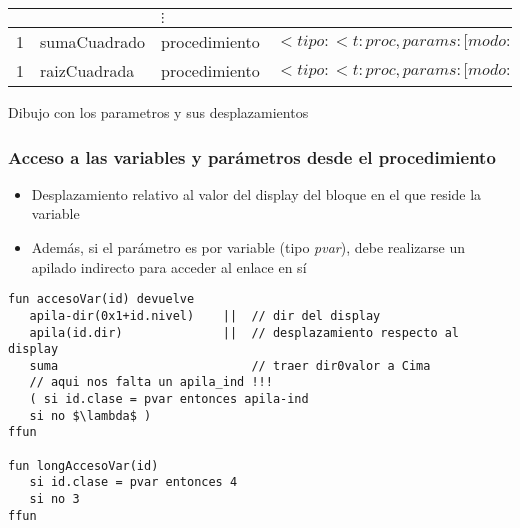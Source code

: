 \documentclass[hyperref={pdfpagelabels=false},tree-dvips,compress]{beamer}
\begin{document}
\begin{frame}[fragile]
\begin{tabular*}{0.80\textwidth}{|l|l|l|l|}
               &                   & $\vdots$          &                                                                                                                                                                                                                                                                       \\ \hline
1              & sumaCuadrado      & procedimiento     & $<tipo:<t:proc, params: {[}modo:valor{]}, tipo:<tipo:<t:num>{]}{[}modo:valor, tipo:<t:num>{]}{[}modo:variable, tipo:<t:num>{]}>>>$                    \\ \hline
1              & raizCuadrada      & procedimiento     & $<tipo:<t:proc, params: {[}modo:valor{]}, tipo:<t:num>{]}>>$                                                                                                                                                   \\ \hline
\end{tabular*}


Dibujo con los parametros y sus desplazamientos

\end{frame}
\begin{frame}[fragile]
\frametitle{Acceso a las variables y parámetros desde el procedimiento}

\begin{itemize}
	\item Desplazamiento relativo al valor del display del bloque en el que reside la variable
	\item Además, si el parámetro es por variable (tipo \emph{pvar}), debe realizarse un apilado indirecto para acceder al enlace en sí
\end{itemize}

\begin{lstlisting}[style=codigoMP,basicstyle=\scriptsize\ttfamily,mathescape]
fun accesoVar(id) devuelve
   apila-dir(0x1+id.nivel)    ||  // dir del display
   apila(id.dir)              ||  // desplazamiento respecto al display
   suma                           // traer dir0valor a Cima
   // aqui nos falta un apila_ind !!!
   ( si id.clase = pvar entonces apila-ind
   si no $\lambda$ )
ffun

fun longAccesoVar(id)
   si id.clase = pvar entonces 4
   si no 3
ffun
\end{lstlisting}

\end{frame}
\end{document}
